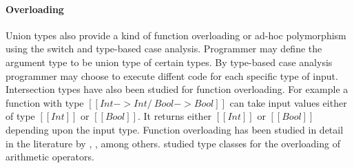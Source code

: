 \paragraph{Overloading}
Union types also provide a kind of function overloading or ad-hoc
polymorphism using the switch and type-based case analysis. Programmer
may define the argument type to be union type of certain types. By
type-based case analysis programmer may choose to execute diffent code
for each specific type of input.  Intersection types have also been
studied for function overloading. For example a function with type
$[[Int -> Int /\ Bool -> Bool]]$ can take input values either of type
$[[Int]]$ or $[[Bool]]$.  It returns either $[[Int]]$ or $[[Bool]]$
depending upon the input type.  Function overloading has been studied
in detail in the literature by \cite{castagna1995calculus},
\cite{cardelli1985understanding}, \cite{stuckey2005theory} among
others.  \citet{wadler1989make} studied type classes for the
overloading of arithmetic operators.
